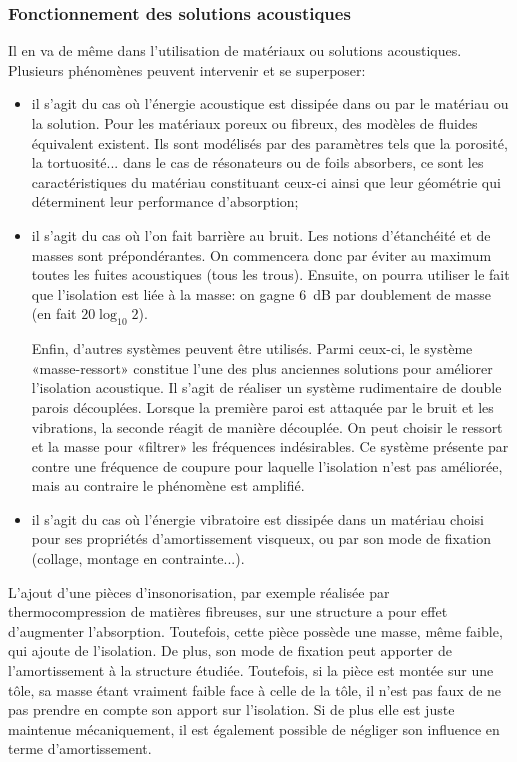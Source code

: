 \medskip
\subsubsection{Fonctionnement des solutions acoustiques}

Il en va de même dans l'utilisation de matériaux ou solutions acoustiques. Plusieurs phénomènes peuvent intervenir et se superposer:
\begin{itemize}
   \item {} il s'agit du cas où l'énergie acoustique est dissipée dans ou par le matériau ou la solution. Pour les matériaux poreux ou fibreux, des modèles de fluides équivalent existent. Ils sont modélisés par des paramètres tels que la porosité, la tortuosité... dans le cas de résonateurs ou de foils absorbers, ce sont les caractéristiques du matériau constituant ceux-ci ainsi que leur géométrie qui déterminent leur performance d'absorption;
   \item {} il s'agit du cas où l'on fait barrière au bruit. Les notions d'étanchéité et de masses sont prépondérantes. On commencera donc par éviter au maximum toutes les fuites acoustiques (tous les trous). Ensuite, on pourra utiliser le fait que l'isolation est liée à la masse: on gagne 6~dB par doublement de masse (en fait $20\log_{10}2$).

Enfin, d'autres systèmes peuvent être utilisés. Parmi ceux-ci, le système «masse-ressort» constitue l'une des plus anciennes solutions pour améliorer l'isolation acoustique. Il s'agit de réaliser un système rudimentaire de double parois découplées. Lorsque la première paroi est attaquée par le bruit et les vibrations, la seconde réagit de manière découplée. On peut choisir le ressort et la masse pour «filtrer» les fréquences indésirables. Ce système présente par contre une fréquence de coupure pour laquelle l'isolation n'est pas améliorée, mais au contraire le phénomène est amplifié.
   
   \item {} il s'agit du cas où l'énergie vibratoire est dissipée dans un matériau choisi pour ses propriétés d'amortissement visqueux, ou par son mode de fixation (collage, montage en contrainte...).
\end{itemize}
L'ajout d'une pièces d'insonorisation, par exemple réalisée par thermocompression de matières fibreuses, sur une structure a pour effet d'augmenter l'absorption. Toutefois, cette pièce possède une masse, même faible, qui ajoute de l'isolation. De plus, son mode de fixation peut apporter de l'amortissement à la structure étudiée. Toutefois, si la pièce est montée sur une tôle, sa masse étant vraiment faible face à celle de la tôle, il n'est pas faux de ne pas prendre en compte son apport sur l'isolation. Si de plus elle est juste maintenue mécaniquement, il est également possible de négliger son influence en terme d'amortissement.

